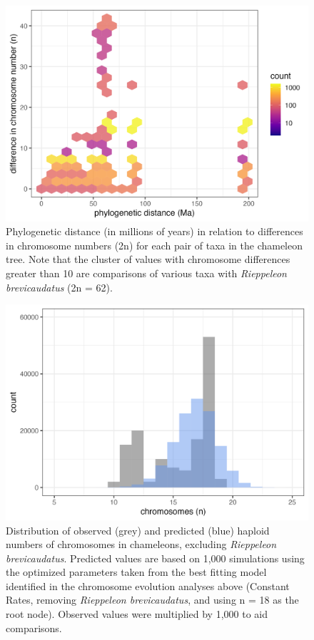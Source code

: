 \documentclass[a4paper, 12pt]{article}
\begin{document}
\newpage
\begin{figure}[H]
 \centering
  \includegraphics[width = \linewidth]{figures/taxon-pairs-distances.png}
  \caption{Phylogenetic distance (in millions of years) in relation to differences in chromosome numbers (2n) for each pair of taxa in the chameleon tree. Note that the cluster of values with chromosome differences greater than 10 are comparisons of various taxa with \textit{Rieppeleon brevicaudatus} (2n = 62).
}
  \label{fig-otus-pairwise}
\end{figure} 

\newpage
\begin{figure}[H]
 \centering
  \includegraphics[width = \linewidth]{figures/chromevol-simulations-numbers.png}
  \caption{Distribution of observed (grey) and predicted (blue) haploid numbers of chromosomes in chameleons, excluding \textit{Rieppeleon brevicaudatus}. Predicted values are based on 1,000 simulations using the optimized parameters taken from the best fitting model identified in the chromosome evolution analyses above (Constant Rates, removing \textit{Rieppeleon brevicaudatus}, and using n = 18 as the root node). Observed values were multiplied by 1,000 to aid comparisons.
}
  \label{fig-otus-predicted}
\end{figure} 
\end{document}
